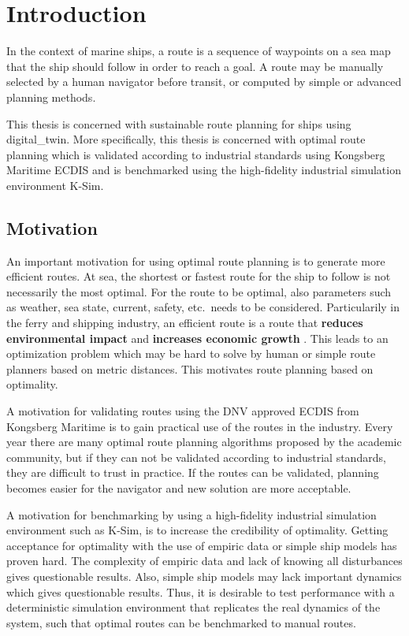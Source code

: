 \chapter{Introduction}

In the context of marine ships, a \gls{route} is a sequence of waypoints on a sea map that the ship should follow in order to reach a goal. A route may be manually selected by a human navigator before transit, or computed by simple or advanced planning methods.

This thesis is concerned with sustainable route planning for ships using \gls{digital_twin}. More specifically, this thesis is concerned with optimal route planning which is validated according to industrial standards using Kongsberg Maritime ECDIS and is benchmarked using the high-fidelity industrial simulation environment K-Sim.


\section{Motivation}

An important motivation for using optimal route planning is to generate more efficient routes. At sea, the shortest or fastest route for the ship to follow is not necessarily the most optimal. For the route to be optimal, also parameters such as weather, sea state, current, safety, etc.\ needs to be considered. Particularily in the ferry and shipping industry, an efficient route is a route that \textbf{reduces environmental impact} and \textbf{increases economic growth} \parencite{bitar2017}. This leads to an optimization problem which may be hard to solve by human or simple route planners based on metric distances. This motivates route planning based on optimality.

A motivation for validating routes using the DNV approved ECDIS from Kongsberg Maritime is to gain practical use of the routes in the industry. Every year there are many optimal route planning algorithms proposed by the academic community, but if they can not be validated according to industrial standards, they are difficult to trust in practice. If the routes can be validated, planning becomes easier for the navigator and new solution are more acceptable. 

A motivation for benchmarking by using a high-fidelity industrial simulation environment such as K-Sim, is to increase the credibility of optimality. Getting acceptance for optimality with the use of empiric data or simple ship models has proven hard. The complexity of empiric data and lack of knowing all disturbances gives questionable results. Also, simple ship models may lack important dynamics which gives questionable results. Thus, it is desirable to test performance with a deterministic simulation environment that replicates the real dynamics of the system, such that optimal routes can be benchmarked to manual routes.


